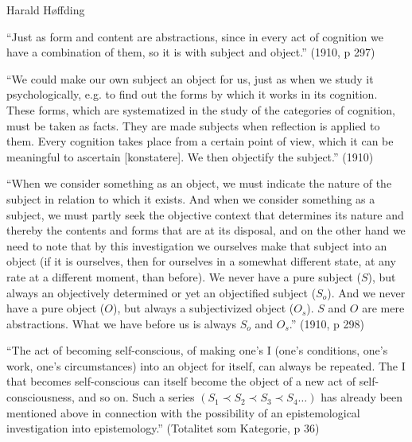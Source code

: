 \documentclass[ignorenonframetext, ]{beamer}
\begin{document}
\begin{frame}{Harald Høffding}

  ``Just as form and content are abstractions, since in every act of
  cognition we have a combination of them, so it is with subject and
  object.'' (1910, p 297)

\end{frame}

\begin{frame}

  ``We could make our own subject an object for us, just as when we
  study it psychologically, e.g. to find out the forms by which it
  works in its cognition. These forms, which are systematized in the
  study of the categories of cognition, must be taken as facts. They
  are made subjects when reflection is applied to them. Every
  cognition takes place from a certain point of view, which it can be
  meaningful to ascertain [konstatere]. We then objectify the
  subject.'' (1910)


\end{frame}

\begin{frame}

  ``When we consider something as an object, we must indicate the
  nature of the subject in relation to which it exists. And when we
  consider something as a subject, we must partly seek the objective
  context that determines its nature and thereby the contents and
  forms that are at its disposal, and on the other hand we need to
  note that by this investigation we ourselves make that subject into
  an object (if it is ourselves, then for ourselves in a somewhat
  different state, at any rate at a different moment, than before). We
  never have a pure subject ($S$), but always an objectively
  determined or yet an objectified subject ($S_o$). And we never have
  a pure object ($O$), but always a subjectivized object ($O_s$). $S$
  and $O$ are mere abstractions. What we have before us is always
  $S_o$ and $O_s$.'' (1910, p 298)


\end{frame}

\begin{frame}

  ``The act of becoming self-conscious, of making one's I (one's
  conditions, one's work, one's circumstances) into an object for
  itself, can always be repeated. The I that becomes self-conscious
  can itself become the object of a new act of self-consciousness, and
  so on. Such a series $(S_1 \prec S_2 \prec S_3 \prec S_4 \dots )$
  has already been mentioned above in connection with the possibility
  of an epistemological investigation into epistemology.'' (Totalitet
  som Kategorie, p 36)

\end{frame}
\end{document}
